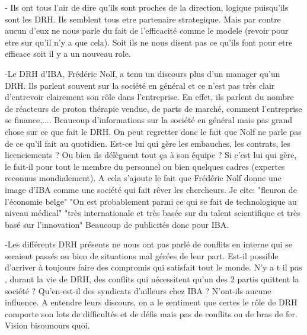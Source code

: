 
- Ils ont tous l'air de dire qu'ils sont proches de la direction, logique puisqu'ils sont les DRH. Ils semblent tous etre partenaire strategique. Mais par contre aucun d'eux ne nous parle du fait de l'efficacité comme le modele (revoir pour etre sur qu'il n'y a que cela). Soit ils ne nous disent pas ce qu'ils font pour etre efficace soit il y a un nouveau role. 


-Le DRH d'IBA, Frédéric Nolf, a tenu un discours plus d'un manager qu'un DRH. Ils parlent souvent sur la société en général et ce n'est pas très clair d'entrevoir clairement son rôle dans l'entreprise. En effet, ils parlent du nombre de réacteurs de proton thérapie vendue, de parts de marché, comment l'entreprise se finance,.... Beaucoup d'informations sur la société en général mais pas grand chose sur ce que fait le DRH. On peut regretter donc le fait que Nolf ne parle pas de ce qu'il fait au quotidien. Est-ce lui qui gère les embauches, les contrats, les licenciements ? Ou bien ils délèguent tout ça à son équipe ? Si c'est lui qui gère, le fait-il pour tout le membre du personnel ou bien quelques cadres (expertes reconnus mondialement). 
 A cela s'ajoute le fait que Frédéric Nolf donne une image d'IBA comme une société qui fait rêver les chercheurs.
 Je cite:
 "fleuron de l'économie belge"
 "On est probablement parmi ce qui se fait de technologique au niveau médical"
 "très internationale  et très basée sur du talent scientifique et très basé sur l'innovation"
 Beaucoup de publicités donc pour IBA.
 
 
 
-Les différents DRH présents ne nous ont pas parlé de conflits en interne qui se seraient passés ou bien de situations mal gérées de leur part. Est-il possible d'arriver à toujours faire des compromis qui satisfait tout le monde. N'y a t il pas , durant la vie de DRH, des conflits qui nécessitent qu'un des 2 partis quittent la société ? Qu'en-est-il des syndicats d'ailleurs chez IBA ? N'ont-ils aucune influence. A entendre leurs discours, on a le sentiment que certes le rôle de DRH comporte son lots de difficultés et de défis mais pas de conflits ou de bras de fer. Vision bisounours quoi.
